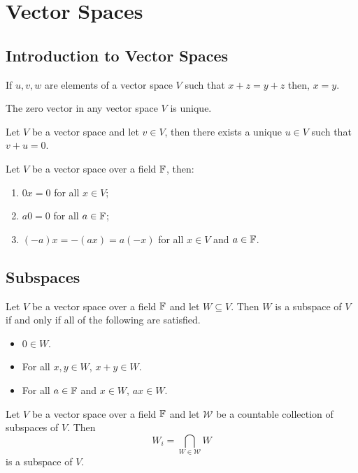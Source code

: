 \section{Vector Spaces}

\subsection{Introduction to Vector Spaces}

\begin{proposition}
	If $u,v,w$ are elements of a vector space $V$ such that $x+z=y+z$ then, $x=y$.
\end{proposition}
\begin{proposition}
	The zero vector in any vector space $V$ is unique.
\end{proposition}
\begin{proposition}
	Let $V$ be a vector space and let $v\in V$, then there exists a unique $u\in V$ such that $v+u=0$.
\end{proposition}
\begin{proposition}
	Let $V$ be a vector space over a field $\mathbb{F}$, then:
	\begin{enumerate}
		\item $0x=0$ for all $x\in V$;
		\item $a0 = 0$ for all $a\in\mathbb{F}$;
		\item $(-a)x=-(ax)=a(-x)$ for all $x\in V$ and $a\in\mathbb{F}$.
	\end{enumerate}
\end{proposition}

\pagebreak

\subsection{Subspaces}

\begin{thm}
	Let $V$ be a vector space over a field $\mathbb{F}$ and let $W\subseteq V$.
	Then $W$ is a subspace of $V$ if and only if all of the following are satisfied.
	\begin{itemize}
		\item $0\in W$.
		\item For all $x,y\in W$, $x+y\in W$.
		\item For all $a\in\mathbb{F}$ and $x\in W$, $ax\in W$.
	\end{itemize}
\end{thm}

\begin{thm}
	Let $V$ be a vector space over a field $\mathbb{F}$ and let $\mathcal{W}$ be a countable collection of subspaces of $V$.
	Then
	\[
		W_i = \bigcap_{W\in\mathcal{W}} W
	\]
	is a subspace of $V$.
\end{thm}

